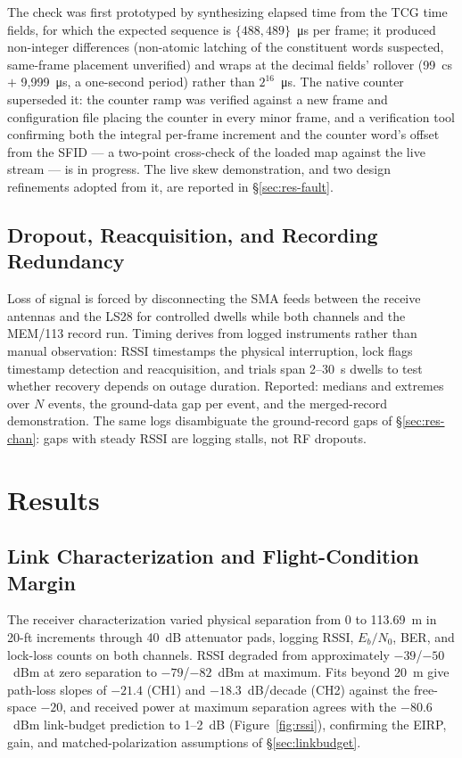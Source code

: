 \documentclass[12pt,letterpaper]{article}
\begin{document}
The check was first prototyped by synthesizing elapsed time from the TCG
time fields, for which the expected sequence is
$\{488, 489\}$~\si{\micro\second} per frame; it produced non-integer
differences (non-atomic latching of the constituent words suspected,
same-frame placement unverified) and wraps at the decimal fields' rollover
(99~cs $+$ 9{,}999~\si{\micro\second}, a one-second period) rather than
$2^{16}$~\si{\micro\second}. The native counter superseded it: the counter
ramp was verified against a new frame and configuration file placing the
counter in every minor frame, and a verification tool confirming both the
integral per-frame increment and the counter word's offset from the SFID
--- a two-point cross-check of the loaded map against the live stream ---
is in progress. The live skew demonstration, and two design refinements
adopted from it, are reported in \S\ref{sec:res-fault}.

\subsection{Dropout, Reacquisition, and Recording Redundancy}\label{sec:dropout}

Loss of signal is forced by disconnecting the SMA feeds between the
receive antennas and the LS28 for controlled dwells while both channels
and the MEM/113 record run. Timing derives from logged instruments rather
than manual observation: RSSI timestamps the physical interruption, lock
flags timestamp detection and reacquisition, and trials span 2--30~s
dwells to test whether recovery depends on outage duration. Reported:
medians and extremes over $N$ events, the ground-data gap per event, and
the merged-record demonstration. The same logs disambiguate the
ground-record gaps of \S\ref{sec:res-chan}: gaps with steady RSSI are
logging stalls, not RF dropouts.

\section{Results}\label{sec:results}

\subsection{Link Characterization and Flight-Condition Margin}\label{sec:res-link}

The receiver characterization varied physical separation from 0 to
113.69~m in 20-ft increments through 40~dB attenuator pads, logging RSSI,
$E_b/N_0$, BER, and lock-loss counts on both channels. RSSI degraded from
approximately $-39$/$-50$~dBm at zero separation to $-79$/$-82$~dBm at
maximum. Fits beyond 20~m give path-loss slopes of $-21.4$ (CH1) and
$-18.3$~dB/decade (CH2) against the free-space $-20$, and received power
at maximum separation agrees with the $-80.6$~dBm link-budget prediction
to 1--2~dB (Figure~\ref{fig:rssi}), confirming the EIRP, gain, and
matched-polarization assumptions of \S\ref{sec:linkbudget}.
\end{document}
